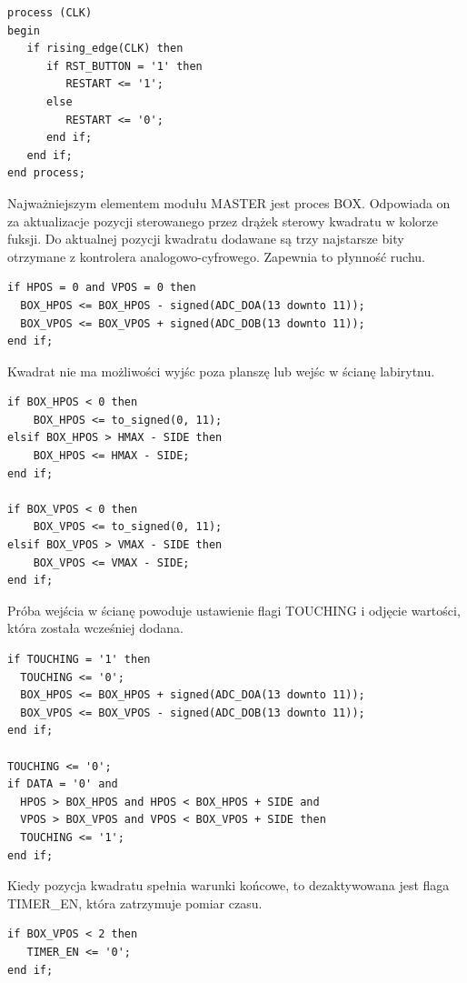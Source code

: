 \documentclass[11pt]{article}
\begin{document}
\begin{lstlisting}[caption=Sterowanie restartem]
process (CLK)
begin
   if rising_edge(CLK) then
      if RST_BUTTON = '1' then
         RESTART <= '1';
      else
         RESTART <= '0';
      end if;
   end if;
end process;
\end{lstlisting}

Najważniejszym elementem modułu MASTER jest proces BOX. 
Odpowiada on za aktualizacje pozycji sterowanego przez drążek sterowy kwadratu w kolorze fuksji.
Do aktualnej pozycji kwadratu dodawane są trzy najstarsze bity otrzymane z kontrolera analogowo-cyfrowego.
Zapewnia to płynność ruchu.

\begin{lstlisting}[caption=Aktualizowanie pozycji kwadratu]
if HPOS = 0 and VPOS = 0 then
  BOX_HPOS <= BOX_HPOS - signed(ADC_DOA(13 downto 11));
  BOX_VPOS <= BOX_VPOS + signed(ADC_DOB(13 downto 11));
end if;
\end{lstlisting}


Kwadrat nie ma możliwości wyjśc poza planszę lub wejśc w ścianę labirytnu.

\begin{lstlisting}[caption=Zapobieganie wyścia poza mapę]
if BOX_HPOS < 0 then
    BOX_HPOS <= to_signed(0, 11);
elsif BOX_HPOS > HMAX - SIDE then
    BOX_HPOS <= HMAX - SIDE;
end if;

if BOX_VPOS < 0 then
    BOX_VPOS <= to_signed(0, 11);
elsif BOX_VPOS > VMAX - SIDE then
    BOX_VPOS <= VMAX - SIDE;
end if;
\end{lstlisting}

Próba wejścia w ścianę powoduje ustawienie flagi TOUCHING i odjęcie wartości, która została wcześniej dodana.

\begin{lstlisting}[caption=Przywracanie pozycji kwadratu]
if TOUCHING = '1' then
  TOUCHING <= '0';
  BOX_HPOS <= BOX_HPOS + signed(ADC_DOA(13 downto 11));
  BOX_VPOS <= BOX_VPOS - signed(ADC_DOB(13 downto 11));
end if;

TOUCHING <= '0';
if DATA = '0' and
  HPOS > BOX_HPOS and HPOS < BOX_HPOS + SIDE and 
  VPOS > BOX_VPOS and VPOS < BOX_VPOS + SIDE then
  TOUCHING <= '1';
end if;
\end{lstlisting}

Kiedy pozycja kwadratu spełnia warunki końcowe, to dezaktywowana jest flaga TIMER\_EN, która zatrzymuje pomiar czasu.

\begin{lstlisting}[caption=Zatrzymywanie pomiaru czasu]
if BOX_VPOS < 2 then
   TIMER_EN <= '0';
end if;
\end{lstlisting}
\end{document}
